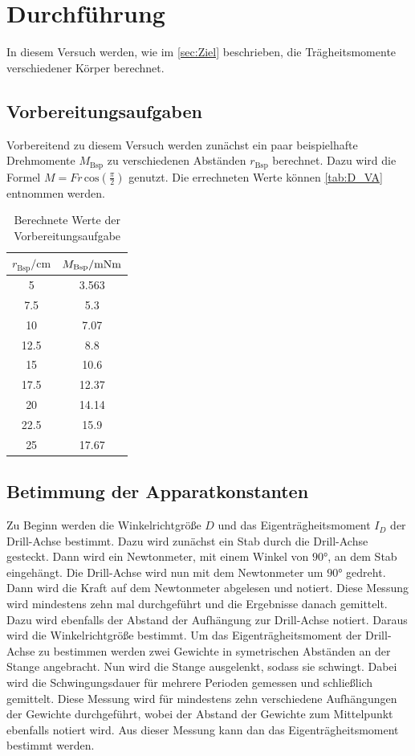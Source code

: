 \section{Durchführung}
\label{sec:Durchführung}
In diesem Versuch werden, wie im \autoref{sec:Ziel} beschrieben, die Trägheitsmomente verschiedener Körper berechnet. 

\subsection{Vorbereitungsaufgaben}
\label{subsec:D_Va}
Vorbereitend zu diesem Versuch werden zunächst ein paar beispielhafte Drehmomente $M_{\text{Bsp}}$
zu verschiedenen Abständen $r_{\text{Bsp}}$ berechnet. Dazu wird die Formel $M = Fr\, \text{cos}(\frac{\pi}{2})$ genutzt. Die errechneten Werte können \autoref{tab:D_VA} entnommen werden.
\begin{table}
    \centering
    \caption{Berechnete Werte der Vorbereitungsaufgabe} 
    \label{tab:D_VA}
    \begin{tabular}{c c}
        \toprule
        $r_{\text{Bsp}}\mathrm{/} \unit{\centi\metre}$ & $M_{\text{Bsp}}\mathrm{/}\unit{{\milli\newton\metre}}$\\
        \midrule
        5 & 3.563 \\
        7.5 & 5.3 \\
        10 & 7.07 \\
        12.5 & 8.8 \\
        15 & 10.6 \\
        17.5 & 12.37 \\
        20 & 14.14 \\
        22.5 & 15.9 \\
        25 & 17.67 \\
        \bottomrule 
    \end{tabular}
\end{table}
\subsection{Betimmung der Apparatkonstanten}
\label{subsec:D_const}
Zu Beginn werden die Winkelrichtgröße $D$ und das Eigenträgheitsmoment $I_D$ der Drill-Achse bestimmt. Dazu wird zunächst ein Stab durch die Drill-Achse gesteckt. Dann wird ein Newtonmeter, mit einem 
Winkel von $90\unit{\degree}$, an dem Stab eingehängt. Die Drill-Achse wird nun mit dem Newtonmeter um $90\unit{\degree}$ gedreht. Dann wird die Kraft auf dem Newtonmeter abgelesen und notiert. Diese 
Messung wird mindestens zehn mal durchgeführt und die Ergebnisse danach gemittelt. Dazu wird ebenfalls der Abstand der Aufhängung zur Drill-Achse notiert. Daraus wird die Winkelrichtgröße 
bestimmt. Um das Eigenträgheitsmoment der Drill-Achse zu bestimmen werden zwei Gewichte in symetrischen Abständen an der Stange angebracht. Nun wird die Stange ausgelenkt, sodass sie schwingt.
Dabei wird die Schwingungsdauer für mehrere Perioden gemessen und schließlich gemittelt. Diese Messung wird für mindestens zehn verschiedene Aufhängungen der Gewichte durchgeführt, wobei der Abstand
der Gewichte zum Mittelpunkt ebenfalls notiert wird. Aus dieser Messung kann dan das Eigenträgheitsmoment bestimmt werden.

